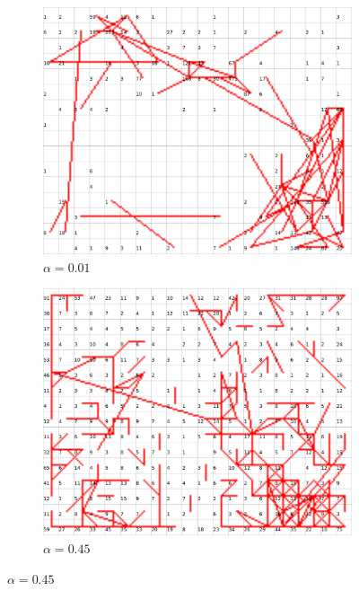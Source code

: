 \documentclass{acm_proc_article-sp}
\begin{document}
\begin{figure}
\centering
    \centering
    \begin{subfigure}[b]{0.24\linewidth}
        \includegraphics[width=\linewidth]{img/wine-20x16-neighbourhood-graph-r-06-alpha-0,01}
        \caption{$\alpha=0.01$}
        \label{fig:wine-20x16-neighbourhood-graph-r-06-alpha-0,01}
    \end{subfigure}
    \begin{subfigure}[b]{0.24\linewidth}
        \includegraphics[width=\linewidth]{img/wine-20x16-neighbourhood-graph-r-06-alpha-0,45}
        \caption{$\alpha=0.45$}

\end{subfigure}
\end{figure}
\end{document}
